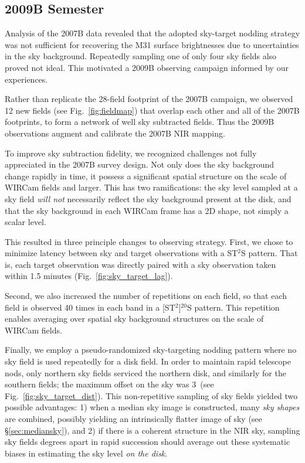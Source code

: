\documentclass[iop]{emulateapj}
\newcommand{\Fig}[1]{Fig.~\ref{fig:#1}}  %
\newcommand{\Sec}[1]{\S\ref{sec:#1}}  %
\begin{document}
\subsection{2009B Semester}
\label{sub:obs9}

Analysis of the 2007B data revealed that the adopted sky-target nodding strategy was not sufficient for recovering the M31 surface brightnesses due to uncertainties in the sky background.
Repeatedly sampling one of only four sky fields also proved not ideal.
This motivated a 2009B observing campaign informed by our experiences.

Rather than replicate the 28-field footprint of the 2007B campaign, we observed 12 new fields (see \Fig{fieldmap}) that overlap each other and all of the 2007B footprints, to form a network of well sky subtracted fields.
Thus the 2009B observations augment and calibrate the 2007B NIR mapping.

To improve sky subtraction fidelity, we recognized challenges not fully appreciated in the 2007B survey design.
Not only does the sky background change rapidly in time, it possess a significant spatial structure on the scale of WIRCam fields and larger.
This has two ramifications: the sky level sampled at a sky field \emph{will not} necessarily reflect the sky background present at the disk, and that the sky background in each WIRCam frame has a 2D shape, not simply a scalar level.

This resulted in three principle changes to observing strategy. First, we chose to minimize latency between sky and target observations with a ST$^2$S pattern. That is, each target observation was directly paired with a sky observation taken within 1.5 minutes (\Fig{sky_target_lag}).

Second, we also increased the number of repetitions on each field, so that each field is observed 40 times in each band in a [ST$^2$]$^{20}$S pattern. This repetition enables averaging over spatial sky background structures on the scale of WIRCam fields.

Finally, we employ a pseudo-randomized sky-targeting nodding pattern where no sky field is used repeatedly for a disk field.
In order to maintain rapid telescope nods, only northern sky fields serviced the northern disk, and similarly for the southern fields; the maximum offset on the sky was 3\arcdeg\ (see \Fig{sky_target_dist}).
This non-repetitive sampling of sky fields yielded two possible advantages: 1) when a median sky image is constructed, many \emph{sky shapes} are combined, possibly yielding an intrinsically flatter image of sky (see \Sec{mediansky}), and 2) if there is a coherent structure in the NIR sky, sampling sky fields degrees apart in rapid succession should average out these systematic biases in estimating the sky level \emph{on the disk}.
\end{document}
